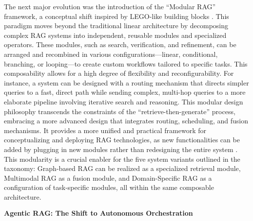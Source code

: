 \documentclass[11pt]{article}
\begin{document}
The next major evolution was the introduction of the ``Modular RAG'' framework, a conceptual shift inspired by LEGO-like building blocks \cite{ref23}. This paradigm moves beyond the traditional linear architecture by decomposing complex RAG systems into independent, reusable modules and specialized operators. These modules, such as search, verification, and refinement, can be arranged and recombined in various configurations---linear, conditional, branching, or looping---to create custom workflows tailored to specific tasks. This composability allows for a high degree of flexibility and reconfigurability. For instance, a system can be designed with a routing mechanism that directs simpler queries to a fast, direct path while sending complex, multi-hop queries to a more elaborate pipeline involving iterative search and reasoning. This modular design philosophy transcends the constraints of the ``retrieve-then-generate'' process, embracing a more advanced design that integrates routing, scheduling, and fusion mechanisms. It provides a more unified and practical framework for conceptualizing and deploying RAG technologies, as new functionalities can be added by plugging in new modules rather than redesigning the entire system \cite{ref23}. This modularity is a crucial enabler for the five system variants outlined in the taxonomy: Graph-based RAG can be realized as a specialized retrieval module, Multimodal RAG as a fusion module, and Domain-Specific RAG as a configuration of task-specific modules, all within the same composable architecture.

\textbf{Agentic RAG: The Shift to Autonomous Orchestration}
\end{document}
